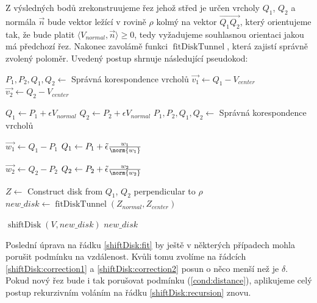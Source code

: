Z výsledných bodů zrekonstruujeme řez jehož střed je určen vrcholy
$ Q_1 $, $ Q_2 $ a normála $ \vec{n} $ bude vektor ležící v rovině $ \rho $
kolmý na vektor $ \overrightarrow{Q_1 Q_2} $, který orientujeme tak, že bude platit
$ \langle V_{normal}, \vec{n} \rangle \geq 0 $, tedy vyžadujeme souhlasnou
orientaci jakou má předchozí řez. Nakonec zavolámě funkci
$ \operatorname{fitDiskTunnel} $, která zajistí správně zvolený poloměr.
Uvedený postup shrnuje následující pseudokod:


\begin{algorithmic}[1]
\label{alg:shiftDisk}

    \State $ P_1, P_2, Q_1, Q_2 \gets $ Správná korespondence vrcholů
    \State $ \vec{v_1} \gets Q_1 - V_{center} $
    \State $ \vec{v_2} \gets Q_2 - V_{center} $
    \Statex

        \State $ Q_1 \gets P_1 + \epsilon V_{normal} $
        \State $ Q_2 \gets P_2 + \epsilon V_{normal} $
    \EndIf
    \State $ P_1, P_2, Q_1, Q_2 \gets $ Správná korespondence vrcholů
    \Statex

    \State $ \vec{w_1} \gets Q_1 - P_1 $
        $ Q_1 \gets P_1 + \tilde{\epsilon} \frac{w_1}{\norm{w_1}} $ \label{shiftDisk:correction1}
    \EndIf

    \State $ \vec{w_2} \gets Q_2 - P_2 $
        $ Q_2 \gets P_2 + \tilde{\epsilon} \frac{w_2}{\norm{w_2}} $ \label{shiftDisk:correction2}
    \EndIf
    \Statex

    \State $ Z \gets $ Construct disk from $ Q_1$, $Q_2$ perpendicular to $ \rho $
    \State $ new\_disk \gets \operatorname{fitDiskTunnel}(Z_{normal}, Z_{center}) $ \label{shiftDisk:fit}
    \Statex

        \State \Return $ \operatorname{shiftDisk}(V, new\_disk) $ \label{shiftDisk:recursion}
    \Else
        \State \Return $ new\_disk $
    \EndIf

\EndFunction

\end{algorithmic}

Poslední úprava na řádku \ref{shiftDisk:fit} by ještě v některých případech mohla
porušit podmínku na vzdálenost. Kvůli tomu zvolíme na řádcích
\ref{shiftDisk:correction1} a \ref{shiftDisk:correction2} posun o něco
menší než je $ \delta $. Pokud nový řez bude i tak porušovat podmínku (\ref{cond:distance}),
aplikujeme celý postup rekurzivním voláním na řádku \ref{shiftDisk:recursion} znovu.

